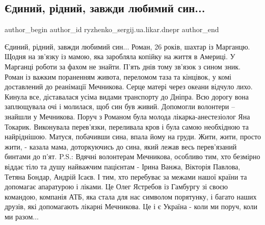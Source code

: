  
 
 
 
 
 
\subsection{Єдиний, рідний, завжди любимий син...}
\label{sec:07_12_2022.fb.ryzhenko_sergij.ua.likar.dnepr.1.syn}
 
\ifcmt
 author_begin
   author_id ryzhenko_sergij.ua.likar.dnepr
 author_end
\fi

\obeycr
Єдиний, рідний, завжди любимий син...
Роман, 26 років, шахтар із Марганцю.
Щодня на зв'язку із мамою, яка заробляла копійку на життя в Америці.
У Марганці роботи за фахом не знайти.
П'ять днів тому зв'язок з сином зник.
Роман із важким пораненням живота, переломом таза та кінцівок, у комі доставлений до реанімації Мечникова.
Серце матері через океани відчуло лихо.
Кинула все, діставалася усіма видами транспорту до Дніпра.
Всю дорогу вона заплющувала очі і молилася, щоб син був живий.
Допомогли волонтери – знайшли у Мечникова.
Поруч з Романом була молода лікарка-анестезіолог Яна Токарик.
Виконувала перев'язки, переливала кров і була самою необхідною та найріднішою.
Матуся, побачивши сина, впала йому на груди.
Жити, жити, просто жити, - казала мама, доторкуючись до сина, який лежав весь перев'язаний бинтами до п'ят. 
P.S.: Вдячні волонтерам Мечникова, особливо тим, хто безмірно віддає тіло та душу найважчим пацієнтам - Ірина Ванжа, Вікторія Павлова, Тетяна Бондар, Андрій Ісаєв.
І тим, хто перебуває за межами нашої країни та допомагає апаратурою і ліками.
Це Олег Ястребов із Гамбургу зі своєю командою, компанія АТБ, яка стала для нас символом порятунку, і багато наших друзів, які допомагають лікарні Мечникова.
Це і є Україна - коли ми поруч, коли ми разом...
\restorecr

